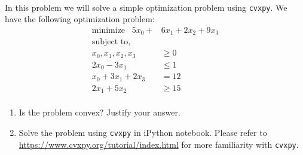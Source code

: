 \\
In this problem we will solve a simple optimization problem using \texttt{cvxpy}. We have the following optimization problem:\\
\begin{align*}
    \text{minimize}\;\;\; 5x_0 + &6x_1 + 2x_2 + 9x_3\\
    \text{subject to,}\\
    x_0,x_1,x_2,x_3 &\geq 0\\
    2x_0 - 3x_1 &\leq 1\\
    x_0 + 3x_1 + 2x_3  &= 12\\
    2x_1 + 5x_2 &\geq 15\\
\end{align*}
\begin{enumerate}
    \item 
    Is the problem convex? Justify your answer.
    
    \sol{
    
    }
    \item
    Solve the problem using \texttt{cvxpy} in iPython notebook. Please refer to \url{https://www.cvxpy.org/tutorial/index.html} for more familiarity with \texttt{cvxpy}.
    
    \sol{
    
    }
\end{enumerate}

